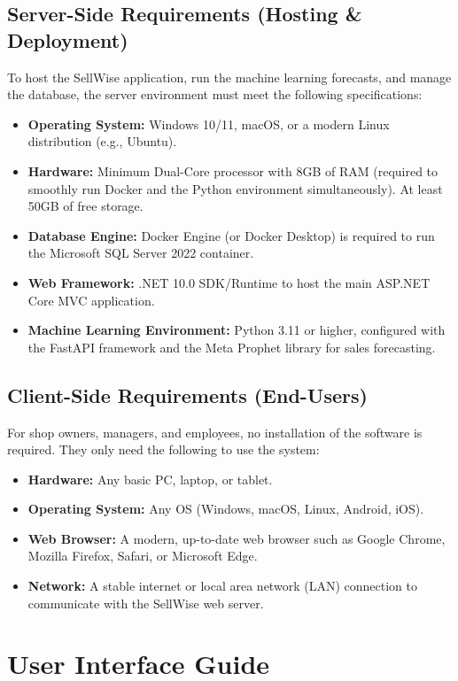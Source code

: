 \documentclass[12pt,a4paper]{report}
\begin{document}
\subsection{Server-Side Requirements (Hosting \& Deployment)}
To host the SellWise application, run the machine learning forecasts, and manage the database, the server environment must meet the following specifications:
\begin{itemize}
    \item \textbf{Operating System:} Windows 10/11, macOS, or a modern Linux distribution (e.g., Ubuntu).
    \item \textbf{Hardware:} Minimum Dual-Core processor with 8GB of RAM (required to smoothly run Docker and the Python environment simultaneously). At least 50GB of free storage.
    \item \textbf{Database Engine:} Docker Engine (or Docker Desktop) is required to run the Microsoft SQL Server 2022 container.
    \item \textbf{Web Framework:} .NET 10.0 SDK/Runtime to host the main ASP.NET Core MVC application.
    \item \textbf{Machine Learning Environment:} Python 3.11 or higher, configured with the FastAPI framework and the Meta Prophet library for sales forecasting.
\end{itemize}

\subsection{Client-Side Requirements (End-Users)}
For shop owners, managers, and employees, no installation of the software is required. They only need the following to use the system:
\begin{itemize}
    \item \textbf{Hardware:} Any basic PC, laptop, or tablet.
    \item \textbf{Operating System:} Any OS (Windows, macOS, Linux, Android, iOS).
    \item \textbf{Web Browser:} A modern, up-to-date web browser such as Google Chrome, Mozilla Firefox, Safari, or Microsoft Edge.
    \item \textbf{Network:} A stable internet or local area network (LAN) connection to communicate with the SellWise web server.
\end{itemize}

\section{User Interface Guide}
\end{document}
